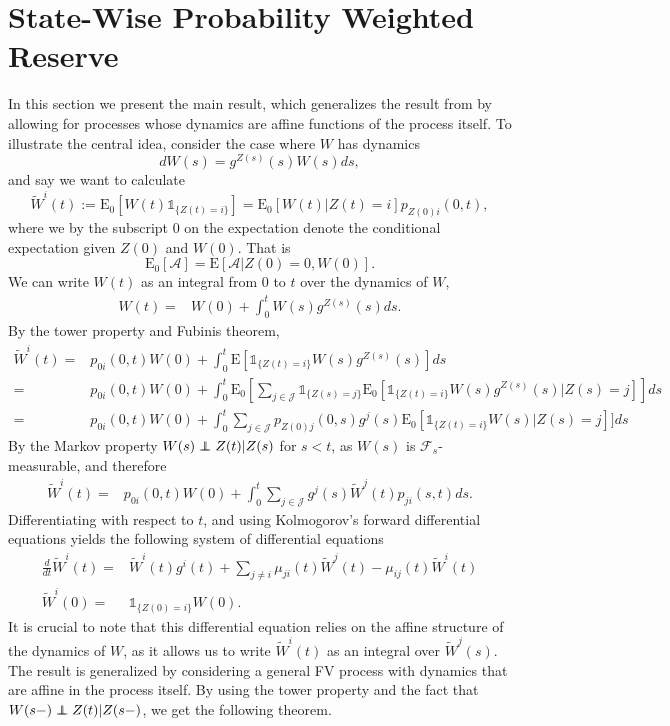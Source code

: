 \documentclass[12pt]{article}
\newcommand{\E}{\text{E}}
\newcommand{\indic}[1]{\mathds{1}_{ \{ #1 \} }}
\newcommand\independent{\protect\mathpalette{\protect\independenT}{\perp}}
\def\independenT#1#2{\mathrel{\rlap{$#1#2$}\mkern2mu{#1#2}}}
\theoremstyle{my_thm}
\begin{document}
\section{State-Wise Probability Weighted Reserve}
In this section we present the main result, which generalizes the result from \citet{Norberg} by allowing for processes whose dynamics are affine functions of the process itself. To illustrate the central idea, consider the case where $W$ has dynamics
$$
dW(s)=g^{Z(s)}(s)W(s) ds,
$$
and say we want to calculate 
$$
\tilde{W}^i(t):=\E_0[W(t)\indic{Z(t)=i}]
=\E_0[W(t)|Z(t)=i]p_{Z(0)i}(0,t),
$$ 
where we by the subscript 0 on the expectation denote the conditional expectation given $Z(0)$ and $W(0)$. That is 
$$
\E_0[\mathcal{A}]=\E [\mathcal{A}|Z(0)=0,W(0)].
$$
We can write $W(t)$ as an integral from 0 to $t$ over the dynamics of $W$,
\begin{align*}
W(t)
=& W(0)+\int_0^t W(s) g^{Z(s)}(s) ds.
\end{align*}
By the tower property and Fubinis theorem,
\begin{align*}
\tilde{W}^i(t)
=&  p_{0i}(0,t) W(0) +
\int_0^t \E[ \indic{Z(t)=i} W(s) g^{Z(s)}(s)] ds
\\
=&   p_{0i}(0,t) W(0) +
\int_0^t \E_0 \left[ \sum_{j \in \mathcal{J}} \indic{Z(s)=j}\E_0[ \indic{Z(t)=i} W(s) g^{Z(s)}(s)|Z(s)=j] \right] ds\\
=&   p_{0i}(0,t) W(0)+
\int_0^t  \sum_{j \in \mathcal{J}} p_{Z(0)j}(0,s)g^{j}(s) \E_0[ \indic{Z(t)=i} W(s)|Z(s)=j]] ds
\end{align*}
By the Markov property $W(s)\independent Z(t)|Z(s)$ for $s<t$, as $W(s)$ is $\mathcal{F}_s$-measurable, and therefore
\begin{align*}
\tilde{W}^i(t)=&  p_{0i}(0,t) W(0) +
\int_0^t  \sum_{j \in \mathcal{J}} g^{j}(s) \tilde{W}^j(t) p_{ji}(s,t)ds.
\end{align*}
Differentiating with respect to $t$, and using Kolmogorov's forward differential equations yields the following system of differential equations
\begin{align*}
\frac{d}{dt} \tilde{W}^i(t)=&\tilde{W}^i(t)g^i(t)+ \sum_{j\neq i} \mu_{ji}(t)\tilde{W}^j(t)-\mu_{ij}(t)\tilde{W}^i(t)
\\
\tilde{W}^i(0)=&\indic{Z(0)=i}W(0).
\end{align*}
It is crucial to note that this differential equation relies on the affine structure of the dynamics of $W$, as it allows us to write $\tilde{W}^i(t)$ as an integral over $\tilde{W}^j(s)$. The result is generalized by considering a general FV process with dynamics that are affine in the process itself. By using the tower property and the fact that $W(s-)\independent Z(t)|Z(s-)$, we get the following theorem.
\end{document}
